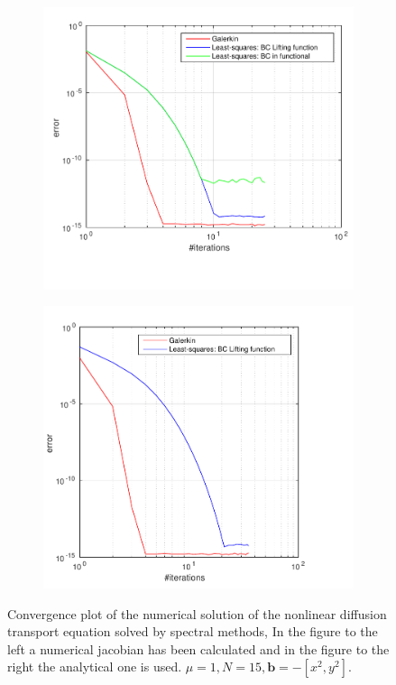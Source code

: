 \begin{figure}[h]
  \centering
  \begin{subfigure}[b]{0.48\textwidth}
	\includegraphics[width=\textwidth]{Figures/Spec_Nonlin_Convergence_Jnum.pdf}
  \end{subfigure}%
  \quad
  \begin{subfigure}[b]{0.48\textwidth}
	\includegraphics[width=\textwidth]{Figures/Spec_Nonlin_Convergence.pdf}
  \end{subfigure}%
  \vspace{-0.1\baselineskip}
	\caption{Convergence plot of the numerical solution of the nonlinear diffusion transport equation solved by spectral methods, In the figure to the left a numerical jacobian has been calculated and in the figure to the right the analytical one is used. $\mu = 1,N=15,\mathbf{b} = -[x^2,y^2]$.}
  \label{fig:SurfDiffTransPositiveFEM}
\end{figure}
